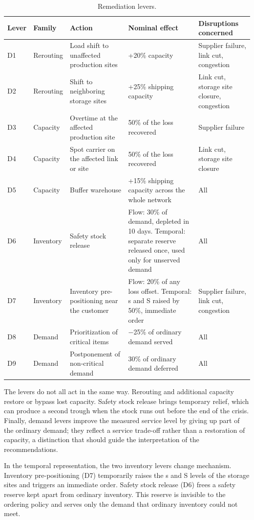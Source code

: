 \begin{table}[htbp]
\caption{Remediation levers.}
\label{tab:d4}
\footnotesize
\begin{tabularx}{\textwidth}{@{}P{1.0cm}P{1.5cm}LLL@{}}
\toprule
\textbf{Lever} & \textbf{Family} & \textbf{Action} & \textbf{Nominal effect} & \textbf{Disruptions concerned} \\
\midrule
D1 & Rerouting & Load shift to unaffected production sites & +20\% capacity & Supplier failure, link cut, congestion \\
D2 & Rerouting & Shift to neighboring storage sites & +25\% shipping capacity & Link cut, storage site closure, congestion \\
D3 & Capacity & Overtime at the affected production site & 50\% of the loss recovered & Supplier failure \\
D4 & Capacity & Spot carrier on the affected link or site & 50\% of the loss recovered & Link cut, storage site closure \\
D5 & Capacity & Buffer warehouse & +15\% shipping capacity across the whole network & All \\
D6 & Inventory & Safety stock release & Flow: 30\% of demand, depleted in 10 days. Temporal: separate reserve released once, used only for unserved demand & All \\
D7 & Inventory & Inventory pre-positioning near the customer & Flow: 20\% of any loss offset. Temporal: s and S raised by 50\%, immediate order & Supplier failure, link cut, congestion \\
D8 & Demand & Prioritization of critical items & $-$25\% of ordinary demand served & All \\
D9 & Demand & Postponement of non-critical demand & 30\% of ordinary demand deferred & All \\
\bottomrule
\end{tabularx}
\end{table}

The levers do not all act in the same way. Rerouting and additional capacity restore or bypass lost capacity. Safety stock release brings temporary relief, which can produce a second trough when the stock runs out before the end of the crisis. Finally, demand levers improve the measured service level by giving up part of the ordinary demand; they reflect a service trade-off rather than a restoration of capacity, a distinction that should guide the interpretation of the recommendations.

In the temporal representation, the two inventory levers change mechanism. Inventory pre-positioning (D7) temporarily raises the s and S levels of the storage sites and triggers an immediate order. Safety stock release (D6) frees a safety reserve kept apart from ordinary inventory. This reserve is invisible to the ordering policy and serves only the demand that ordinary inventory could not meet.

